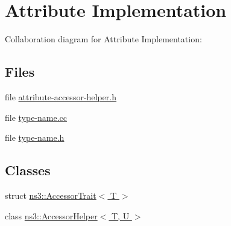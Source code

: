 \hypertarget{group__attributeimpl}{}\section{Attribute Implementation}
\label{group__attributeimpl}
Collaboration diagram for Attribute Implementation\+:
\subsection*{Files}
\begin{DoxyCompactItemize}
\item 
file \hyperlink{attribute-accessor-helper_8h}{attribute-\/accessor-\/helper.\+h}
\item 
file \hyperlink{type-name_8cc}{type-\/name.\+cc}
\item 
file \hyperlink{type-name_8h}{type-\/name.\+h}
\end{DoxyCompactItemize}
\subsection*{Classes}
\begin{DoxyCompactItemize}
\item 
struct \hyperlink{structns3_1_1AccessorTrait}{ns3\+::\+Accessor\+Trait$<$ T $>$}
\item 
class \hyperlink{classns3_1_1AccessorHelper}{ns3\+::\+Accessor\+Helper$<$ T, U $>$}
\end{DoxyCompactItemize}
